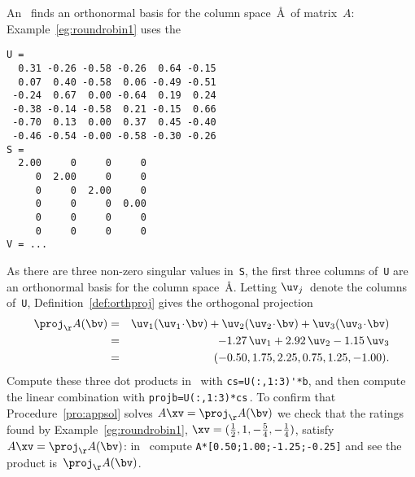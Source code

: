\begin{example}
An \svd\ finds an orthonormal basis for the column space~\AA\ of matrix~\(A\): Example~\ref{eg:roundrobin1} uses the \svd\ \twodp
\setbox\ajrqrbox\hbox{}%
\marginpar{\usebox{\ajrqrbox\\[2ex]}}%
\begin{verbatim}
U =
  0.31 -0.26 -0.58 -0.26  0.64 -0.15
  0.07  0.40 -0.58  0.06 -0.49 -0.51
 -0.24  0.67  0.00 -0.64  0.19  0.24
 -0.38 -0.14 -0.58  0.21 -0.15  0.66
 -0.70  0.13  0.00  0.37  0.45 -0.40
 -0.46 -0.54 -0.00 -0.58 -0.30 -0.26
S =
  2.00     0     0     0
     0  2.00     0     0
     0     0  2.00     0
     0     0     0  0.00
     0     0     0     0
     0     0     0     0
V = ...
\end{verbatim}
As there are three non-zero singular values in~\verb|S|, the first three columns of~\verb|U| are an orthonormal basis for the column space~\AA.
Letting \(\uv_j\)~denote the columns of~\verb|U|, Definition~\ref{def:orthproj} gives the orthogonal projection \twodp
\begin{eqnarray*}
\proj_\AA(\bv)
&=&\uv_1(\uv_1\cdot\bv)+\uv_2(\uv_2\cdot\bv)+\uv_3(\uv_3\cdot\bv)
\\&=&-1.27\,\uv_1+2.92\,\uv_2-1.15\,\uv_3
\\&=&(-0.50,1.75,2.25,0.75,1.25,-1.00).
\end{eqnarray*}
Compute these three dot products in \script\ with \verb|cs=U(:,1:3)'*b|, and then compute the linear combination with \verb|projb=U(:,1:3)*cs|\,.
To confirm that Procedure~\ref{pro:appsol} solves \(A\xv=\proj_\AA(\bv)\) we check that the ratings found by Example~\ref{eg:roundrobin1}, \(\xv=(\frac12,1,-\frac54,-\frac14)\), satisfy \(A\xv=\proj_\AA(\bv)\): in \script\ compute \verb|A*[0.50;1.00;-1.25;-0.25]| and see the product is~\(\proj_\AA(\bv)\).
\end{example}



